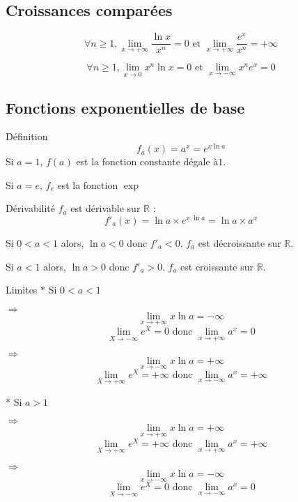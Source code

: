 \subsection{Croissances comparées}
\begin{bclogo}{}
\[\forall n\geqslant 1, \lim\limits_{x \to +\infty} \frac{\ln x}{x^n}=0 \text{ et } \lim\limits_{x \to +\infty} \frac{e^x}{x^n}=+\infty\]
\end{bclogo}

\medskip

\begin{bclogo}{}
\[\forall n\geqslant 1, \lim\limits_{x \to 0} x^n \ln x=0 \text{ et } \lim\limits_{x \to -\infty} x^n e^x=0\]
\end{bclogo}

\subsection{Fonctions exponentielles de base}
\begin{bclogo}{Définition}
\[f_a(x)=a^x=e^{x\ln a}\]
Si $a=1$, $f(a)$ est la fonction constante dégale à$1$.

Si $a=e$, $f_e$ est la fonction $\exp$
\end{bclogo}

\medskip

\begin{bclogo}{Dérivabilité}
$f_a$ est dérivable sur $\mathbb{R}$ : \[f'_a(x)=\ln a\times e^{x.\ln a}=\ln a \times a^x\]

Si $0< a< 1$ alors, $\ln a< 0$ donc $f'_a <0$. $f_a$ est décroissante sur $\mathbb{R}$.

Si $a< 1$ alors, $\ln a> 0$ donc $f'_a> 0$. $f_a$ est croissante sur $\mathbb{R}$.
\end{bclogo}

\medskip

\begin{bclogo}{Limites}
$\ast$ Si $0<a<1$

$\Rightarrow$ \[\lim\limits_{x \to +\infty} x \ln a=-\infty\] 
\[\lim\limits_{X \to -\infty} e^X=0 \text{ donc } \lim\limits_{x \to +\infty} a^x=0\]

$\Rightarrow$ \[\lim\limits_{x \to -\infty} x \ln a=+\infty\]
\[\lim\limits_{X \to +\infty} e^X=+\infty \text{ donc } \lim\limits_{x \to -\infty} a^x=+\infty\]

$\ast$ Si $a>1$

$\Rightarrow$ \[\lim\limits_{x \to +\infty} x \ln a=+\infty\]
\[\lim\limits_{X \to +\infty} e^X=+\infty \text{ donc } \lim\limits_{x \to +\infty} a^x=+\infty\]

$\Rightarrow$ \[\lim\limits_{x \to -\infty} x \ln a=-\infty\]
\[\lim\limits_{X \to -\infty} e^X=0 \text{ donc } \lim\limits_{x \to -\infty} a^x=0\]
\end{bclogo}